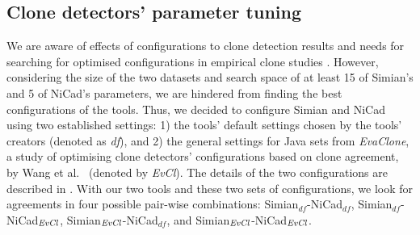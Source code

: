\documentclass{sig-alternate-05-2015}
\begin{document}
\subsection{Clone detectors' parameter tuning}
We are aware of effects of configurations to clone detection results and needs for searching for optimised configurations in empirical clone studies \cite{Wang2013,cr2016ssbse,Ragkhitwetsagul2016,Svajlenko2014}. However, considering the size of the two datasets and search space of at least 15 of Simian's and 5 of NiCad's parameters, we are hindered from finding the best configurations of the tools. Thus, we decided to configure Simian and NiCad using two established settings: 1) the tools' default settings chosen by the tools' creators (denoted as \textit{df}), and 2) the general settings for Java sets from \textit{EvaClone}, a study of optimising clone detectors' configurations based on clone agreement, by Wang et al.~\cite{Wang2013} (denoted by \textit{EvCl}). The details of the two configurations are described in . With our two tools and these two sets of configurations, we look for agreements in four possible pair-wise combinations: Simian$_{df}$-NiCad$_{df}$, Simian$_{df}$-NiCad$_{\textrm{\textit{EvCl}}}$, Simian$_{\textrm{\textit{EvCl}}}$-NiCad$_{df}$, and Simian$_{\textrm{\textit{EvCl}}}$-NiCad$_{\textrm{\textit{EvCl}}}$.

\begin{table}
	\centering
	\caption{Configurations of Simian and NiCad}
	\label{t:param_tuning}
\end{table}
\end{document}
